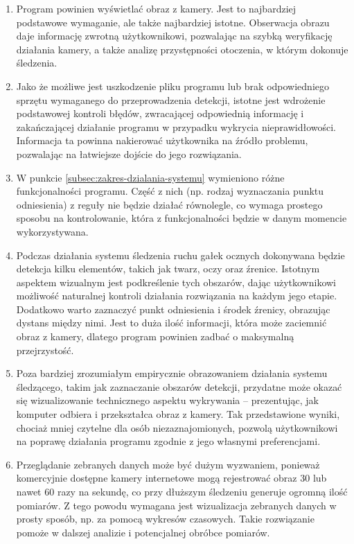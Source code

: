 \documentclass[a4paper,twoside,12pt]{book}
\begin{document}
\begin{enumerate}
	\item Program powinien wyświetlać obraz z kamery. Jest to najbardziej podstawowe wymaganie, ale także najbardziej istotne. Obserwacja obrazu daje informację zwrotną użytkownikowi, pozwalając na szybką weryfikację działania kamery, a także analizę przystępności otoczenia, w którym dokonuje śledzenia.
	\item Jako że możliwe jest uszkodzenie pliku programu lub brak odpowiedniego sprzętu wymaganego do przeprowadzenia detekcji, istotne jest wdrożenie podstawowej kontroli błędów, zwracającej odpowiednią informację i zakańczającej działanie programu w przypadku wykrycia nieprawidłowości. Informacja ta powinna nakierować użytkownika na źródło problemu, pozwalając na łatwiejsze dojście do jego rozwiązania.
	\item W punkcie \ref{subsec:zakres-dzialania-systemu} wymieniono różne funkcjonalności programu. Część z nich (np. rodzaj wyznaczania punktu odniesienia) z reguły nie będzie działać równolegle, co wymaga prostego sposobu na kontrolowanie, która z funkcjonalności będzie w danym momencie wykorzystywana.
	\item Podczas działania systemu śledzenia ruchu gałek ocznych dokonywana będzie detekcja kilku elementów, takich jak twarz, oczy oraz źrenice. Istotnym aspektem wizualnym jest podkreślenie tych obszarów, dając użytkownikowi możliwość naturalnej kontroli działania rozwiązania na każdym jego etapie. Dodatkowo warto zaznaczyć punkt odniesienia i środek źrenicy, obrazując dystans między nimi. Jest to duża ilość informacji, która może zaciemnić obraz z kamery, dlatego program powinien zadbać o maksymalną przejrzystość.
	\item Poza bardziej zrozumiałym empirycznie obrazowaniem działania systemu śledzącego, takim jak zaznaczanie obszarów detekcji, przydatne może okazać się wizualizowanie technicznego aspektu wykrywania -- prezentując, jak komputer odbiera i przekształca obraz z kamery. Tak przedstawione wyniki, chociaż mniej czytelne dla osób niezaznajomionych, pozwolą użytkownikowi na poprawę działania programu zgodnie z jego własnymi preferencjami.
	\item Przeglądanie zebranych danych może być dużym wyzwaniem, ponieważ komercyjnie dostępne kamery internetowe mogą rejestrować obraz $30$ lub nawet $60$ razy na sekundę, co przy dłuższym śledzeniu generuje ogromną ilość pomiarów. Z tego powodu wymagana jest wizualizacja zebranych danych w prosty sposób, np. za pomocą wykresów czasowych. Takie rozwiązanie pomoże w dalszej analizie i potencjalnej obróbce pomiarów.
\end{enumerate}
\end{document}
